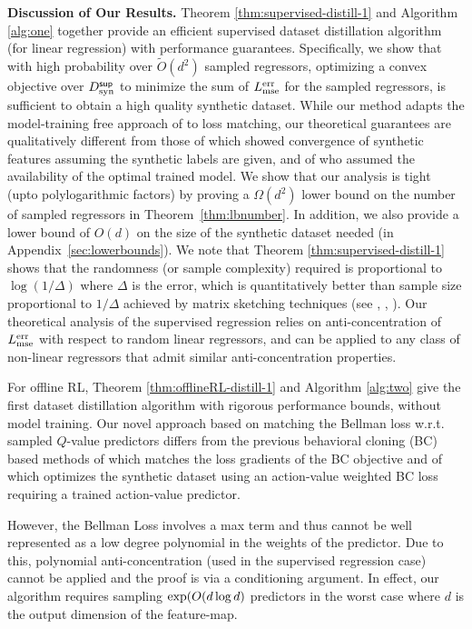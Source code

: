 {\bf Discussion of Our Results.} Theorem \ref{thm:supervised-distill-1} and Algorithm \ref{alg:one} together provide an efficient supervised dataset distillation algorithm (for linear regression) with performance guarantees. Specifically, we show that with high probability over $\tilde{O}(d^2)$ sampled regressors, optimizing a convex objective over $D^{\sf sup}_{\textnormal{syn}}$ to minimize the sum of $L^{\textnormal{err}}_{\textnormal{mse}}$ for the sampled regressors, is sufficient to obtain a high quality synthetic dataset. 
While our method adapts the model-training free approach of \cite{ZBDistribMatch} to loss matching, our theoretical guarantees are qualitatively different from those of \cite{nguyen2021dataset} which showed convergence of synthetic features assuming the synthetic labels are given, and of \cite{chen2024provable} who assumed the availability of the optimal trained model. We show that our analysis is tight (upto polylogarithmic factors) by proving a $\Omega(d^2)$ lower bound on the number of sampled regressors in Theorem~\ref{thm:lbnumber}. In addition, we also provide a lower bound of $O(d)$ on the size of the synthetic dataset needed (in Appendix~\ref{sec:lowerbounds}).
We note that Theorem \ref{thm:supervised-distill-1} shows that the randomness (or sample complexity) required is proportional to $\log (1/\Delta)$ where $\Delta$ is the error, which is quantitatively better than sample size proportional to $1/\Delta$ achieved by matrix sketching techniques (see \cite{garg2024distributed}, \cite{wang2018sketched}, \cite{clarkson2009numerical}).
Our theoretical analysis of the supervised regression relies on anti-concentration of $L^{\textnormal{err}}_{\textnormal{mse}}$ with respect to random linear regressors, and can be applied to any class of non-linear regressors that admit similar anti-concentration properties.

For offline RL, Theorem \ref{thm:offlineRL-distill-1} and Algorithm \ref{alg:two} give the first dataset distillation algorithm with rigorous performance bounds, without model training. Our novel approach based on matching the Bellman loss w.r.t. sampled $Q$-value predictors differs from the previous behavioral cloning (BC) based methods of \cite{light2024datasetdistillationofflinereinforcement} which matches the loss gradients of the BC objective and of \cite{lei2024offline} which optimizes the synthetic dataset using an action-value weighted BC loss requiring a trained action-value predictor.  

However, the Bellman Loss involves a max term and thus 
 cannot be well represented as a low degree polynomial in the weights of the predictor. Due to this, polynomial anti-concentration (used in the supervised regression case) cannot be applied and the proof is via a conditioning argument. In effect, our algorithm requires sampling $\textnormal{exp}(O(d\log d)$ predictors in the worst case where $d$ is the output dimension of the feature-map. 

